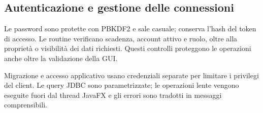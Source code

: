 \documentclass[11pt,a4paper]{article}
\newcommand{\code}[1]{\texttt{\detokenize{#1}}}
\begin{document}
\subsection{Autenticazione e gestione delle connessioni}

Le password sono protette con PBKDF2 e sale casuale; \code{auth_session} conserva l'hash del token di accesso. Le routine verificano scadenza, account attivo e ruolo, oltre alla proprietà o visibilità dei dati richiesti. Questi controlli proteggono le operazioni anche oltre la validazione della GUI.

Migrazione e accesso applicativo usano credenziali separate per limitare i privilegi del client. Le query JDBC sono parametrizzate; le operazioni lente vengono eseguite fuori dal thread JavaFX e gli errori sono tradotti in messaggi comprensibili.
\end{document}
